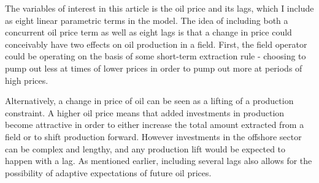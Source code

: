 \documentclass[11pt]{article}
\begin{document}
The variables of interest in this article is the oil price and its lags, which I include as eight linear parametric terms in the model.  The idea of including both a concurrent oil price term as well as eight lags is that a change in price could conceivably have two effects on oil production in a field.  First, the field operator could be operating on the basis of some short-term extraction rule - choosing to pump out less at times of lower prices in order to pump out more at periods of high prices.  

Alternatively, a change in price of oil can be seen as a lifting of a production constraint.  A higher oil price means that added investments in production become attractive in order to either increase the total amount extracted from a field or to shift production forward.  However investments in the offshore sector can be complex and lengthy, and any production lift would be expected to happen with a lag.  As mentioned earlier, including several lags also allows for the possibility of adaptive expectations of future oil prices.  
\end{document}
